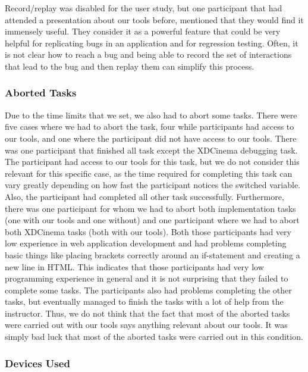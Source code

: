 Record/replay was disabled for the user study, but one participant that had attended a presentation about our tools before, mentioned that they would find it immensely useful. They consider it as a powerful feature that could be very helpful for replicating bugs in an application and for regression testing. Often, it is not clear how to reach a bug and being able to record the set of interactions that lead to the bug and then replay them can simplify this process.

\subsubsection{Aborted Tasks}

Due to the time limits that we set, we also had to abort some tasks. There were five cases where we had to abort the task, four while participants had access to our tools, and one where the participant did not have access to our tools. There was one participant that finished all task except the XDCinema debugging task. The participant had access to our tools for this task, but we do not consider this relevant for this specific case, as the time required for completing this task can vary greatly depending on how fast the participant notices the switched variable. Also, the participant had completed all other task successfully. Furthermore, there was one participant for whom we had to abort both implementation tasks (one with our tools and one without) and one participant where we had to abort both XDCinema tasks (both with our tools). Both those participants had very low experience in web application development and had problems completing basic things like placing brackets correctly around an if-statement and creating a new line in HTML. This indicates that those participants had very low programming experience in general and it is not surprising that they failed to complete some tasks. The participants also had problems completing the other tasks, but eventually managed to finish the tasks with a lot of help from the instructor. Thus, we do not think that the fact that most of the aborted tasks were carried out with our tools says anything relevant about our tools. It was simply bad luck that most of the aborted tasks were carried out in this condition.

\subsubsection{Devices Used}

